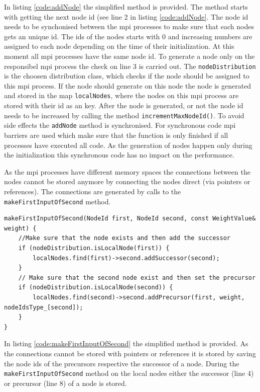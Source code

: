 \documentclass[12pt]{article}
\begin{document}
In listing \ref{code:addNode} the simplified method is provided.
The method starts with getting the next node id (see line 2 in listing \ref{code:addNode}.
The node id needs to be synchonised between the mpi processes to make sure that each nodes gets an unique id.
The ids of the nodes starts with 0 and increasing numbers are assigned to each node depending on the time of their initialization.
At this moment all mpi processes have the same node id.
To generate a node only on the responsibel mpi process the check on line 3 is carried out.
The \texttt{nodeDistribution} is the choosen distribution class, which checks if the node should be assigned to this mpi process.
If the node should generate on this node the node is generated and stored in the map \texttt{localNodes}, where the nodes on this mpi process are stored with their id as an key.
After the node is generated, or not the node id needs to be increased by calling the method \texttt{incrementMaxNodeId()}.
To avoid side effects the \texttt{addNode} method is synchronised.
For synchronous code mpi barriers are used which make sure that the function is only finished if all processes have executed all code.
As the generation of nodes happen only during the initialization this synchronous code has no impact on the performance.




As the mpi processes have different memory spaces the connections between the nodes cannot be stored anymore by connecting the nodes direct (via pointers or references).
The connections are generated by calls to the \texttt{makeFirstInputOfSecond} method.


\begin{lstlisting}[caption=The simplified \texttt{makeFirstInputOfSecond} method of the network.,label=code:makeFirstInputOfSecond]
makeFirstInputOfSecond(NodeId first, NodeId second, const WeightValue& weight) {
	//Make sure that the node exists and then add the successor
	if (nodeDistribution.isLocalNode(first)) {
		localNodes.find(first)->second.addSuccessor(second);
	}
	// Make sure that the second node exist and then set the precursor
	if (nodeDistribution.isLocalNode(second)) {
		localNodes.find(second)->second.addPrecursor(first, weight, nodeIdsType_[second]);
	}
}
\end{lstlisting}

In listing \ref{code:makeFirstInputOfSecond} the simplified method is provided.
As the connections cannot be stored with pointers or references it is stored by saving the node ids of the precursors respective the successor of a node.
During the \texttt{makeFirstInputOfSecond} method on the local nodes either the successor (line 4) or precursor (line 8) of a node is stored.
\end{document}
